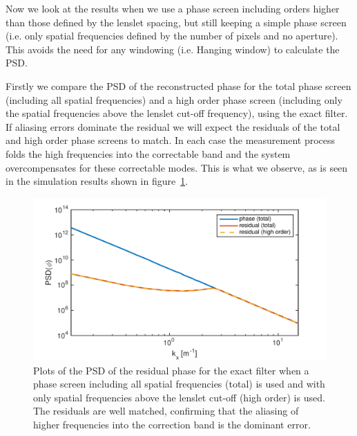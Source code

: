 \documentclass[pdf]{note}
\begin{document}
Now we look at the results when we use a phase screen including orders higher
than those defined by the lenslet spacing, but still keeping a simple phase screen
(i.e. only spatial frequencies defined by the number of pixels and no aperture).  This
avoids the need for any windowing (i.e. Hanging window) to calculate the PSD.

Firstly we compare the PSD of the reconstructed phase for the total phase screen
(including all spatial frequencies) and a high order phase screen (including only
the spatial frequencies above the lenslet cut-off frequency), using the exact
filter.  If aliasing errors dominate
the residual we will expect the residuals of the total and high order phase screens
to match.  In each case the measurement process folds the high frequencies into the
correctable band and the system overcompensates for these correctable modes.
This is what we observe, as is seen in the simulation results shown in 
figure~\ref{fig:PSDPhaseTotal&HO}.

\begin{figure}[htdp]
    \centerline{
      \includegraphics[scale=0.7]{plots/psdPhaseTotal&HO}
   }
    \caption{Plots of the PSD of the residual phase for the exact filter when a phase
    		screen including all spatial frequencies (total) is used and with only
		spatial frequencies above the lenslet cut-off (high order) is used.  The residuals
		are well matched, confirming that the aliasing of higher frequencies into the
		correction band is the dominant error.
    }
    \label{fig:PSDPhaseTotal&HO}
\end{figure}
\end{document}
